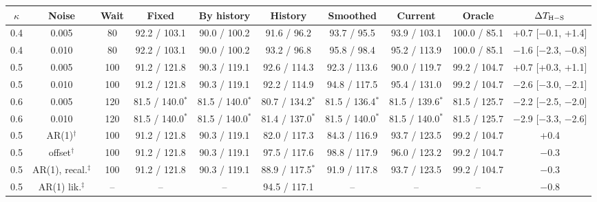 \begin{tabular}{cccccccccc}
\toprule
$\kappa$ & Noise & Wait & Fixed & By history & History & Smoothed & Current & Oracle & $\Delta T_{\rm H-S}$ \\
\midrule
0.4 & 0.005 & 80 & 92.2 / 103.1 & 90.0 / 100.2 & 91.6 / 96.2 & 93.7 / 95.5 & 93.9 / 103.1 & 100.0 / 85.1 & +0.7 [$-$0.1, +1.4] \\
0.4 & 0.010 & 80 & 92.2 / 103.1 & 90.0 / 100.2 & 93.2 / 96.8 & 95.8 / 98.4 & 95.2 / 113.9 & 100.0 / 85.1 & $-$1.6 [$-$2.3, $-$0.8] \\
0.5 & 0.005 & 100 & 91.2 / 121.8 & 90.3 / 119.1 & 92.6 / 114.3 & 92.3 / 113.6 & 90.0 / 119.7 & 99.2 / 104.7 & +0.7 [+0.3, +1.1] \\
0.5 & 0.010 & 100 & 91.2 / 121.8 & 90.3 / 119.1 & 92.2 / 114.9 & 94.8 / 117.5 & 95.4 / 131.0 & 99.2 / 104.7 & $-$2.6 [$-$3.0, $-$2.1] \\
0.6 & 0.005 & 120 & 81.5 / 140.0$^\ast$ & 81.5 / 140.0$^\ast$ & 80.7 / 134.2$^\ast$ & 81.5 / 136.4$^\ast$ & 81.5 / 139.6$^\ast$ & 81.5 / 125.7 & $-$2.2 [$-$2.5, $-$2.0] \\
0.6 & 0.010 & 120 & 81.5 / 140.0$^\ast$ & 81.5 / 140.0$^\ast$ & 81.4 / 137.0$^\ast$ & 81.5 / 140.0$^\ast$ & 81.5 / 140.0$^\ast$ & 81.5 / 125.7 & $-$2.9 [$-$3.3, $-$2.6] \\
\midrule
0.5 & AR(1)$^\dagger$ & 100 & 91.2 / 121.8 & 90.3 / 119.1 & 82.0 / 117.3 & 84.3 / 116.9 & 93.7 / 123.5 & 99.2 / 104.7 & +0.4 \\
0.5 & offset$^\dagger$ & 100 & 91.2 / 121.8 & 90.3 / 119.1 & 97.5 / 117.6 & 98.8 / 117.9 & 96.0 / 123.2 & 99.2 / 104.7 & $-$0.3 \\
0.5 & AR(1), recal.$^\ddagger$ & 100 & 91.2 / 121.8 & 90.3 / 119.1 & 88.9 / 117.5$^\ast$ & 91.9 / 117.8 & 93.7 / 123.5 & 99.2 / 104.7 & $-$0.3 \\
0.5 & AR(1) lik.$^\ddagger$ & -- & -- & -- & 94.5 / 117.1 & -- & -- & -- & $-$0.8 \\
\bottomrule
\end{tabular}
